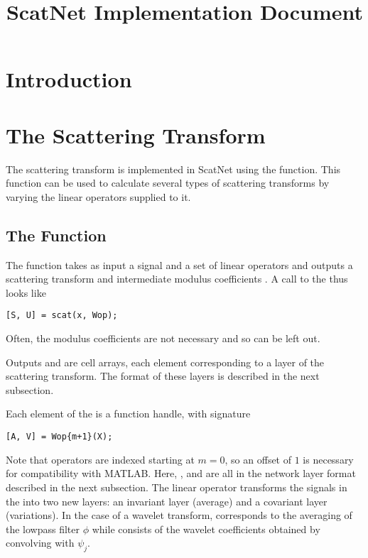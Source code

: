\documentclass[twocolumn]{article}
\title{ScatNet Implementation Document}
\begin{document}
	
\maketitle

\section{Introduction}

\section{The Scattering Transform}

The scattering transform is implemented in ScatNet using the  function. This function can be used to calculate several types of scattering transforms by varying the linear operators supplied to it.

\subsection{The  Function}

The  function takes as input a signal  and a set of linear operators  and outputs a scattering transform  and intermediate modulus coefficients . A call to the  thus looks like
\begin{lstlisting}
[S, U] = scat(x, Wop);
\end{lstlisting}
Often, the modulus coefficients  are not necessary and so can be left out.

Outputs  and  are cell arrays, each element corresponding to a layer of the scattering transform. The format of these layers is described in the next subsection.

Each element of the  is a function handle, with signature
\begin{lstlisting}
[A, V] = Wop{m+1}(X);
\end{lstlisting}
Note that operators are indexed starting at $m = 0$, so an offset of $1$ is necessary for compatibility with MATLAB. Here, ,  and  are all in the network layer format described in the next subsection. The linear operator  transforms the signals in the  into two new layers: an invariant layer  (average) and a covariant layer  (variations). In the case of a wavelet transform,  corresponds to the averaging of the lowpass filter $\phi$ while  consists of the wavelet coefficients obtained by convolving with $\psi_j$.
\end{document}

